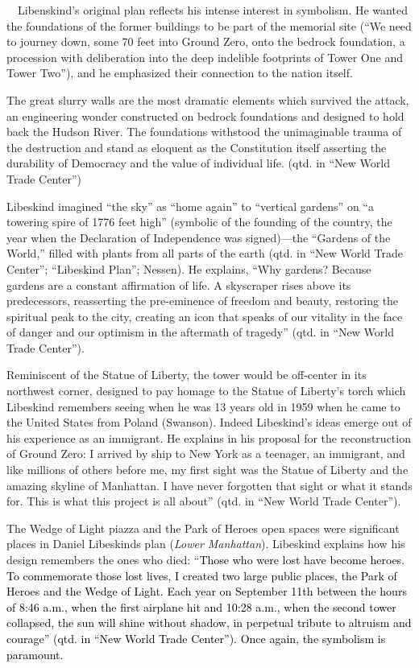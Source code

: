 \textcolor[rgb]{0.13725491,0.13725491,0.13725491}{\ \ Libenskind’s
original plan reflects his intense interest in symbolism.  He wanted
the foundations of the former buildings to be part of the memorial site
(“}We need to journey down, some 70 feet into Ground Zero, onto the
bedrock foundation, a procession with deliberation into the deep
indelible footprints of Tower One and Tower Two”),
\textcolor[rgb]{0.13725491,0.13725491,0.13725491}{and he emphasized
their connection to the nation itself.  }

The great slurry walls are the most dramatic elements which survived the
attack, an engineering wonder constructed on bedrock foundations and
designed to hold back the Hudson River.  The foundations withstood the
unimaginable trauma of the destruction and stand as eloquent as the
Constitution itself asserting the durability of Democracy and the value
of individual life.  (qtd. in “New World Trade Center”) 

Libeskind imagined “the sky” as “home again” to “vertical gardens” on “a
towering spire of 1776 feet high” (symbolic of the founding of the
country, the year when the Declaration of Independence was signed)—the
“Gardens of the World,” filled with plants from all parts of the earth
(qtd. in “New World Trade Center”; “Libeskind Plan”; Nessen).  He
explains, “Why gardens?  Because gardens are a constant affirmation of
life.  A skyscraper rises above its predecessors, reasserting the
pre-eminence of freedom and beauty, restoring the spiritual peak to the
city, creating an icon that speaks of our vitality in the face of
danger and our optimism in the aftermath of tragedy” (qtd. in “New
World Trade Center”).

\textcolor[rgb]{0.13725491,0.13725491,0.13725491}{Reminiscent of the
Statue of Liberty, the tower would be off-center in its northwest
corner, designed to pay homage to the Statue of Liberty’s torch which
Libeskind remembers seeing when he was 13 years old in 1959 when he
came to the United States from Poland (Swanson).  Indeed }Libeskind’s
ideas emerge out of his experience as an immigrant.  He explains in his
proposal for the reconstruction of Ground Zero: {\textquotedbl}I
arrived by ship to New York as a teenager, an immigrant, and like
millions of others before me, my first sight was the Statue of Liberty
and the amazing skyline of Manhattan.  I have never forgotten that
sight or what it stands for.  This is what this project is all about”
(qtd. in “New World Trade Center”).  

The Wedge of Light piazza and the Park of Heroes open spaces were
significant places in Daniel Libeskind{\textquotesingle}s plan
(\textit{Lower Manhattan}).  Libeskind explains how his design
remembers the ones who died: “\textcolor{black}{Those who were lost
have become heroes.  To commemorate those lost lives, I created two
large public places, the Park of Heroes and the Wedge of Light.  Each
year on September 11th between the hours of 8:46 a.m., when the first
airplane hit and 10:28 a.m., when the second tower collapsed, the sun
will shine without shadow, in perpetual tribute to altruism and
courage” (qtd. in “New World Trade Center”).  Once again, the symbolism
is paramount.  }

